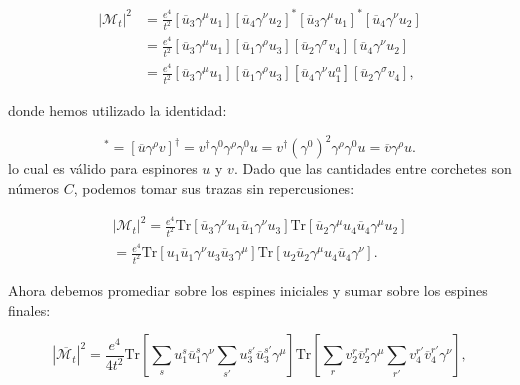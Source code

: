 \begin{equation}
\begin{aligned}
|\mathcal{M}_t|^2 &= \frac{e^4}{t^2} [\overline{u}_3\gamma^\mu u_1][\overline{u}_4\gamma^\nu u_2]^* [\overline{u}_3\gamma^\mu u_1]^*[\overline{u}_4\gamma^\nu u_2] \\
&= \frac{e^4}{t^2} [\overline{u}_3\gamma^\mu u_1][\overline{u}_1 \gamma^\rho u_3] [\overline{u}_2 \gamma^\sigma v_4] [\overline{u}_4\gamma^\nu u_2] \\
&= \frac{e^4}{t^2} [\overline{u}_3\gamma^\mu u_1][\overline{u}_1 \gamma^\rho u_3] [\overline{u}_4\gamma^\nu u_1^a][\overline{u}_2 \gamma^\sigma v_4],
\end{aligned}
\end{equation}

donde hemos utilizado la identidad:

\begin{equation}
[\overline{u} \gamma^\rho v]^* = [\overline{u} \gamma^\rho v]^\dagger = v^\dagger \gamma^0 \gamma^\rho \gamma^0 u = v^\dagger (\gamma^0)^2 \gamma^\rho \gamma^0 u = \overline{v} \gamma^\rho u.
\end{equation}
lo cual es válido para espinores $ u $ y $ v $. Dado que las cantidades entre corchetes son números $ C $, podemos tomar sus trazas sin repercusiones:

\begin{equation}
  \begin{aligned}
    |\mathcal{M}_t|^2 = \frac{e^4}{t^2} \text{Tr}[\overline{u}_3\gamma^\nu u_1 \overline{u}_1 \gamma^\nu u_3] \text{Tr}[\overline{u}_2 \gamma^\mu u_4 \overline{u}_4 \gamma^\mu u_2] \\ = \frac{e^4}{t^2} \text{Tr}[u_1 \overline{u}_1 \gamma^\nu u_3 \overline{u}_3 \gamma^\mu] \text{Tr}[u_2 \overline{u}_2 \gamma^\mu u_4 \overline{u}_4 \gamma^\nu].
  \end{aligned}

\end{equation}

Ahora debemos promediar sobre los espines iniciales y sumar sobre los espines finales:

\begin{equation}
|\overline{\mathcal{M}_t}|^2 = \frac{e^4}{4t^2} \text{Tr} \left[ \sum_s u_1^s \overline{u}_1^s \gamma^\nu \sum_{s'} u_3^{s'} \overline{u}_3^{s'} \gamma^\mu \right] \text{Tr} \left[ \sum_r v_2^r \overline{v}_2^r \gamma^\mu \sum_{r'} v_4^{r'} \overline{v}_4^{r'} \gamma^\nu \right],
\end{equation}

